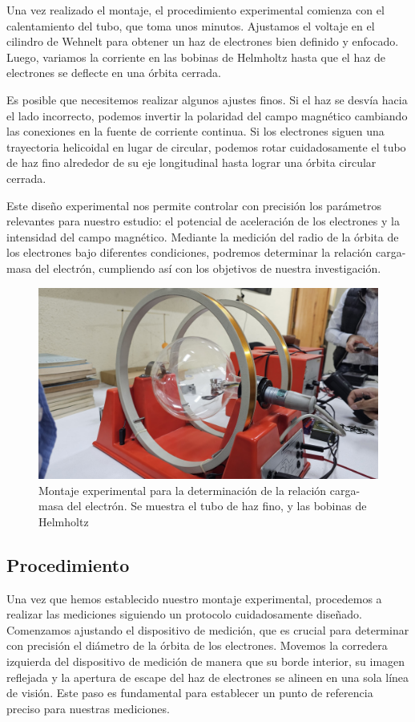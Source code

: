 \documentclass[twocolumn,a4paper,11pt]{scrartcl}
\begin{document}
Una vez realizado el montaje, el procedimiento experimental comienza con el calentamiento del tubo, que toma unos minutos. Ajustamos el voltaje en el cilindro de Wehnelt para obtener un haz de electrones bien definido y enfocado. Luego, variamos la corriente en las bobinas de Helmholtz hasta que el haz de electrones se deflecte en una órbita cerrada.

Es posible que necesitemos realizar algunos ajustes finos. Si el haz se desvía hacia el lado incorrecto, podemos invertir la polaridad del campo magnético cambiando las conexiones en la fuente de corriente continua. Si los electrones siguen una trayectoria helicoidal en lugar de circular, podemos rotar cuidadosamente el tubo de haz fino alrededor de su eje longitudinal hasta lograr una órbita circular cerrada.

Este diseño experimental nos permite controlar con precisión los parámetros relevantes para nuestro estudio: el potencial de aceleración de los electrones y la intensidad del campo magnético. Mediante la medición del radio de la órbita de los electrones bajo diferentes condiciones, podremos determinar la relación carga-masa del electrón, cumpliendo así con los objetivos de nuestra investigación.

\begin{figure}[h]
    \centering
    \includegraphics[width=0.8\linewidth]{montaje_exp_bobinas_helz.jpg}
    \caption{Montaje experimental para la determinación de la relación carga-masa del electrón. Se muestra el tubo de haz fino, y las bobinas de Helmholtz}
    \label{fig:experimental_setup}
\end{figure}

\subsection*{Procedimiento}

Una vez que hemos establecido nuestro montaje experimental, procedemos a realizar las mediciones siguiendo un protocolo cuidadosamente diseñado. Comenzamos ajustando el dispositivo de medición, que es crucial para determinar con precisión el diámetro de la órbita de los electrones. Movemos la corredera izquierda del dispositivo de medición de manera que su borde interior, su imagen reflejada y la apertura de escape del haz de electrones se alineen en una sola línea de visión. Este paso es fundamental para establecer un punto de referencia preciso para nuestras mediciones.
\end{document}
